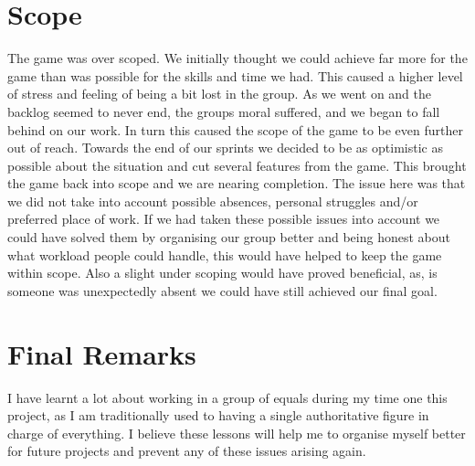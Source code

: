 \documentclass{scrartcl}
\begin{document}
\section{Scope}
The game was over scoped. We initially thought we could achieve far more for the game than was possible for the skills and time we had. This caused a higher level of stress and feeling of being a bit lost in the group. As we went on and the backlog seemed to never end, the groups moral suffered, and we began to fall behind on our work. In turn this caused the scope of the game to be even further out of reach. Towards the end of our sprints we decided to be as optimistic as possible about the situation and cut several features from the game. This brought the game back into scope and we are nearing completion. The issue here was that we did not take into account possible absences, personal struggles and/or preferred place of work. If we had taken these possible issues into account we could have solved them by organising our group better and being honest about what workload people could handle, this would have helped to keep the game within scope. Also a slight under scoping would have proved beneficial, as, is someone was unexpectedly absent we could have still achieved our final goal.

\section{Final Remarks}
I have learnt a lot about working in a group of equals during my time one this project, as I am traditionally used to having a single authoritative figure in charge of everything. I believe these lessons will help me to organise myself better for future projects and prevent any of these issues arising again. 




\end{document}
